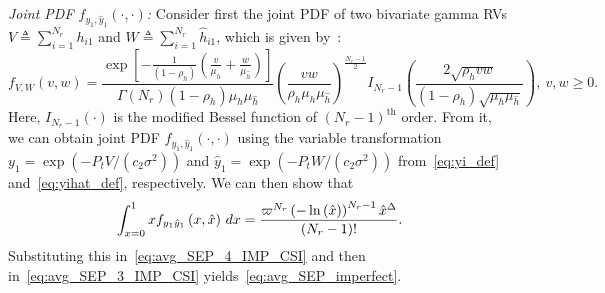 \documentclass[12pt,draftcls,peerreview,onecolumn]{IEEEtran}
\newcommand{\define}{\triangleq}
\newcommand{\muh}{{\mu_{h}}}
\newcommand{\Nr}{{N_r}}
\newcommand{\Pt}{{P_t}}
\newcommand{\such}{h}
\newcommand{\hk}[1]{{\such_{#1}}}
\newcommand{\noisevar}{\sigma^2}
\newcommand{\ctwo}{c_{2}}
\newcommand{\yk}[1]{y_{#1}}
\newcommand{\snr}{\Omega}
\newcommand{\snrhat}{\widehat{\snr}}
\newcommand{\hhat}{\hat{\such}}
\newcommand{\hkhat}[1]{\hhat_{#1}}
\newcommand{\ykhat}[1]{\hat{y}_{#1}}
\newcommand{\muhhat}{\mu_{\hhat}}
\newcommand{\rhoh}{\rho_h}
\newcommand{\T}{\varpi}
\newcommand{\xhat}{\hat{x}}
\newcommand{\sumnr}{\sum_{i=1}^{\Nr}}
\begin{document}
{\em Joint PDF $f_{\yk{1},\ykhat{1}}\left(\cdot,\cdot\right)$:} Consider first the joint PDF of two bivariate gamma RVs $V\define\sumnr\hk{i1}$ and $W\define\sumnr\hkhat{i1}$, which is given by~\cite[(6.1)]{simon_alouini_book}:
\begin{equation}
\label{eq:bivargammaPDF}
f_{V,W}(v,w) = \frac{\exp\left[{-\frac{1}{(1-\rhoh)}\left( \frac{v}{\muh}+\frac{w}{\muhhat}\right) } \right]}{\Gamma\left(\Nr \right) \left(1-\rhoh \right)\muh\muhhat }\left(\frac{vw}{\rhoh \muh\muhhat}\right)^{\frac{\Nr-1}{2}}  I_{\Nr-1}\left(\frac{2\sqrt{\rhoh vw}}{(1-\rhoh)\sqrt{\muh\muhhat}}\right),~v, w \geq 0.
\end{equation}
%  
Here, $I_{\Nr-1}\left(\cdot \right) $ is the modified Bessel function of $(\Nr-1)^{\text{th}}$ order. From it, we can obtain joint PDF $f_{\yk{1},\ykhat{1}}\left(\cdot,\cdot\right)$ using the variable transformation $\yk{1}=\exp\left(-\Pt V/(\ctwo\noisevar) \right) $ and $\ykhat{1}=\exp\left(-\Pt W/(\ctwo\noisevar) \right)$ from~\eqref{eq:yi_def} and~\eqref{eq:yihat_def}, respectively.  
%
% 
We can then show that %
\begin{equation}
\label{eq:y1_jpdf}
\int_{x=0}^{1} x f_{\yk{1}\ykhat{1}}\left(x,\xhat\right)\,dx = \frac{\T^{\Nr}\left(-\ln\left({\xhat} \right)\right)^{\Nr-1}\xhat^{\D}}{(\Nr-1)!}.
\end{equation}
Substituting this in~\eqref{eq:avg_SEP_4_IMP_CSI} and then in~\eqref{eq:avg_SEP_3_IMP_CSI}  yields~\eqref{eq:avg_SEP_imperfect}.
\end{document}
